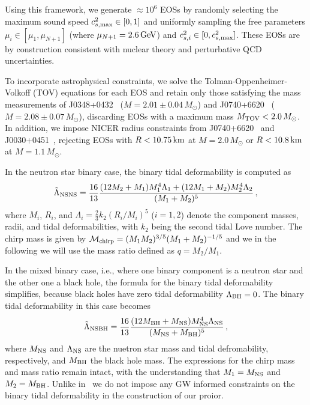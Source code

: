\documentclass[twocolumn]{aastex631}
\begin{document}
Using this framework, we generate $\approx 10^6$ EOSs by randomly selecting the maximum sound speed $c_{s,{\rm max}}^2 \in [0,1]$ and uniformly sampling the free parameters $\mu_i \in [\mu_1, \mu_{N+1}]$ (where $\mu_{N+1} = 2.6\,\rm GeV$) and $c_{s,i}^2 \in [0, c_{s,{\rm max}}^2]$.
These EOSs are by construction consistent with nuclear theory and perturbative QCD uncertainties.

To incorporate astrophysical constraints, we solve the Tolman-Oppenheimer-Volkoff (TOV) equations for each EOS and retain only those satisfying the mass measurements of J0348+0432~\citep{Antoniadis2013} ($M = 2.01\pm 0.04\,M_{\odot}$) and J0740+6620~\citep{Cromartie2019, Fonseca2021} ($M = 2.08 \pm 0.07\,M_{\odot}$), discarding EOSs with a maximum mass $M_{\rm TOV} < 2.0\,M_{\odot}$. 
In addition, we impose NICER radius constraints from J0740+6620~\citep{Miller2021, Riley2021} and J0030+0451~\citep{Riley2019, MCMiller2019b}, rejecting EOSs with $R < 10.75\,\rm km$ at $M = 2.0\,M_{\odot}$ or $R < 10.8\,\rm km$ at $M = 1.1\,M_{\odot}$.
	
In the neutron star binary case, the binary tidal deformability is computed as
\begin{equation} 
 \tilde{\Lambda}_{\rm NSNS} = \frac{16}{13} \frac{ (12M_2 + M_1) M_1^4 \Lambda_1 + (12M_1 + M_2) M_2^4 \Lambda_2}{(M_1 + M_2)^5}\,,
\end{equation}
where $M_i$, $R_i$, and $\Lambda_i = \frac{2}{3} k_2 \left( R_i/M_i \right)^5$ ($i=1,2$) denote the component masses, radii, and tidal deformabilities, with $k_2$ being the second tidal Love number.
The chirp mass is given by $\mathcal{M}_{\rm chirp} = (M_1 M_2)^{3/5} (M_1+M_2)^{-1/5}$ and we in the following we will use the mass ratio defined as $q = M_2/M_1$.
	
In the mixed binary case, i.e., where one binary component is a neutron star and the other one a black hole, the formula for the binary tidal deformability simplifies, because black holes have zero tidal deformability $\Lambda_{\rm BH}=0$.
The binary tidal deformability in this case becomes
\begin{equation} 
 \tilde{\Lambda}_{\rm NSBH} = \frac{16}{13} \frac{ (12M_{\rm BH} + M_{\rm NS}) M_{\rm NS}^4 \Lambda_{\rm NS}}{(M_{\rm NS} + M_{\rm BH})^5}\,,
 \end{equation}
where $M_{\rm NS}$ and $\Lambda_{\rm NS}$ are the nuetron star mass and tidal defromability, respectively, and $M_{\rm BH}$ the black hole mass. 
The expressions for the chirp mass and mass ratio remain intact, with the understanding that $M_1=M_{\rm NS}$ and $M_2=M_{\rm BH}$. 
Unlike in~\citet{altiparmak22,Ecker:2022dlg} we do not impose any GW informed constraints on the binary tidal deformability in the construction of our proior.
	
\end{document}
